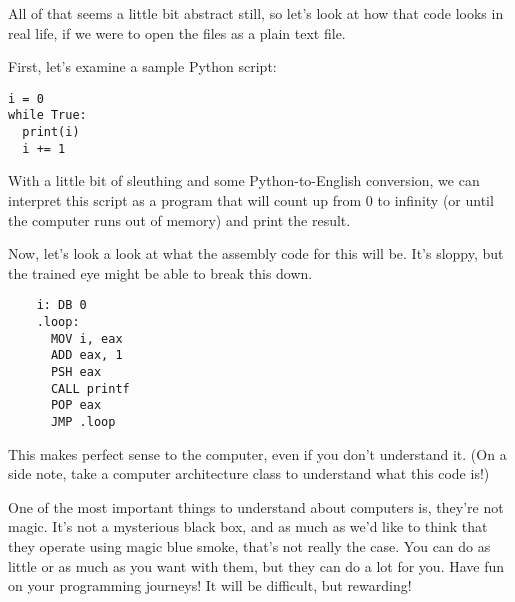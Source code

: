 All of that seems a little bit abstract still, so let’s look at how that code looks in real life, if we were to open the files as a plain text file.\par
First, let’s examine a sample Python script:\par
\begin{lstlisting}[style=pippython]
i = 0
while True:
  print(i)
  i += 1
\end{lstlisting}
With a little bit of sleuthing and some Python-to-English conversion, we can interpret this script as a program that will count up from 0 to infinity (or until the computer runs out of memory) and print the result.\par
Now, let's look a look at what the assembly code for this will be. It's sloppy, but the trained eye might be able to break this down.\par
\begin{lstlisting}
    i: DB 0
    .loop:
      MOV i, eax
      ADD eax, 1
      PSH eax
      CALL printf
      POP eax
      JMP .loop
\end{lstlisting}
This makes perfect sense to the computer, even if you don't understand it. (On a side note, take a computer architecture class to understand what this code is!)\par
{}
One of the most important things to understand about computers is, they're not magic. It's not a mysterious black box, and as much as we'd like to think that they operate using magic blue smoke, that's not really the case. You can do as little or as much as you want with them, but they can do a lot for you. Have fun on your programming journeys! It will be difficult, but rewarding!
